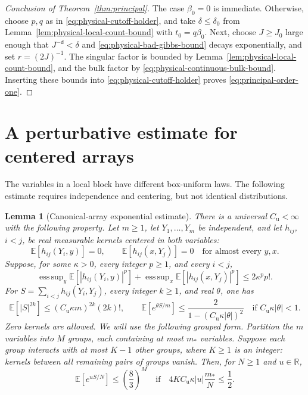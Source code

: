 \documentclass[11pt,reqno]{amsart}
\numberwithin{equation}{section}
\theoremstyle{plain}
\newtheorem{lemma}[lemma]{Lemma}
\theoremstyle{definition}
\renewcommand{\d}{\mathsf d}
\newcommand{\R}{\mathbb R}
\newcommand{\E}{\mathbb E}
\newcommand{\be}{\beta}
\DeclareMathOperator*{\esssup}{ess\,sup}
\begin{document}
\begin{proof}[Conclusion of Theorem~\ref{thm:principal}]
The case $\be_0=0$ is immediate.  Otherwise, choose $p,q$ as in \eqref{eq:physical-cutoff-holder}, and take $\delta\le\delta_0$ from Lemma~\ref{lem:physical-local-count-bound} with $t_0=q\be_0$.  Next, choose $J\ge J_0$ large enough that $J^{-\d}<\delta$ and \eqref{eq:physical-bad-gibbs-bound} decays exponentially, and set $r=(2J)^{-1}$.  The singular factor is bounded by Lemma~\ref{lem:physical-local-count-bound}, and the bulk factor by \eqref{eq:physical-continuous-bulk-bound}.  Inserting these bounds into \eqref{eq:physical-cutoff-holder} proves \eqref{eq:principal-order-one}.
\end{proof}

\section{A perturbative estimate for centered arrays}
\label{sec:canonical-arrays}
The variables in a local block have different box-uniform laws.  The following estimate requires independence and centering, but not identical distributions.

\begin{lemma}[Canonical-array exponential estimate]
\label{lem:canonical-array-exponential}
There is a universal $C_{\mathrm u}<\infty$ with the following property.  Let $m\ge1$, let $Y_1,\ldots,Y_m$ be independent, and let $h_{ij}$, $i<j$, be real measurable kernels centered in both variables:
\begin{equation}
 \E[h_{ij}(Y_i,y)]=0,\qquad \E[h_{ij}(x,Y_j)]=0
 \quad\text{for almost every }y,x.
 \label{eq:canonical-array-centering}
\end{equation}
Suppose, for some $\kappa>0$, every integer $p\ge1$, and every $i<j$,
\begin{equation}
 \esssup_y\E[|h_{ij}(Y_i,y)|^p]
 +\esssup_x\E[|h_{ij}(x,Y_j)|^p]\le2\kappa^p p!.
 \label{eq:canonical-array-kernel-moments}
\end{equation}
For $S=\sum_{i<j}h_{ij}(Y_i,Y_j)$, every integer $k\ge1$, and real $\theta$, one has
\begin{equation}
 \E[|S|^{2k}]\le(C_{\mathrm u}\kappa m)^{2k}(2k)!,
 \qquad
 \E[e^{\theta S/m}]
 \le\frac2{1-(C_{\mathrm u}\kappa|\theta|)^2}
 \quad\text{if }C_{\mathrm u}\kappa|\theta|<1.
 \label{eq:canonical-array-exponential}
\end{equation}
Zero kernels are allowed.  We will use the following grouped form.  Partition the $m$ variables into $M$ groups, each containing at most $m_*$ variables.  Suppose each group interacts with at most $K-1$ other groups, where $K\ge1$ is an integer: kernels between all remaining pairs of groups vanish.  Then, for $N\ge1$ and $u\in\R$,
\begin{equation}
 \E[e^{uS/N}]\le\left(\frac83\right)^M
 \quad\text{if}\quad
 4K C_{\mathrm u}\kappa|u|\frac{m_*}{N}\le\frac12.
 \label{eq:canonical-grouped-exponential}
\end{equation}
\end{lemma}
\end{document}
